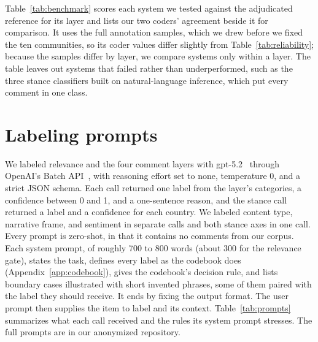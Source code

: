 Table~\ref{tab:benchmark} scores each system we tested against the adjudicated
reference for its layer and lists our two coders' agreement beside it for
comparison. It uses the full annotation samples, which we drew before we fixed the ten communities, so its coder values differ slightly from Table~\ref{tab:reliability}; because the samples differ by layer, we compare
systems only within a layer. The table leaves out systems that failed rather than underperformed, such as the three stance classifiers built on natural-language inference, which put every comment in one class.




\section{Labeling prompts}
\label{app:prompts}

We labeled relevance and the four comment layers with
gpt-5.2~\cite{openai2025gpt52} through OpenAI's Batch
API~\cite{openai2026batchapi}, with reasoning effort set to none, temperature 0,
and a strict JSON schema. Each call returned one label from the layer's
categories, a confidence between 0 and 1, and a one-sentence reason, and the
stance call returned a label and a confidence for each country. We labeled
content type, narrative frame, and sentiment in separate calls and both stance
axes in one call. Every prompt is zero-shot, in that it contains no comments from
our corpus. Each system prompt, of roughly 700 to 800 words (about 300 for the
relevance gate), states the task, defines every label as the codebook does
(Appendix~\ref{app:codebook}), gives the codebook's decision rule, and lists
boundary cases illustrated with short invented phrases, some of them paired with
the label they should receive. It ends by fixing the output format. The user
prompt then supplies the item to label and its context. Table~\ref{tab:prompts}
summarizes what each call received and the rules its system prompt stresses. The
full prompts are in our anonymized repository.

